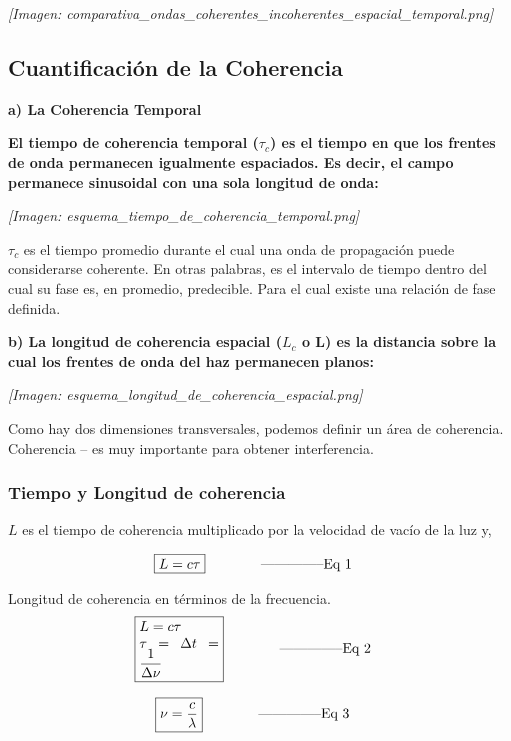 \documentclass[12pt]{article}
\begin{document}
	\textit{[Imagen: comparativa\_ondas\_coherentes\_incoherentes\_espacial\_temporal.png]}
	
	\subsection{Cuantificación de la Coherencia}
	\textbf{a) La Coherencia Temporal}
	
	\textbf{El tiempo de coherencia temporal ($\tau_c$) es el tiempo en que los frentes de onda permanecen igualmente espaciados. Es decir, el campo permanece sinusoidal con una sola longitud de onda:}
	
	\begin{center}
		\textit{[Imagen: esquema\_tiempo\_de\_coherencia\_temporal.png]}
	\end{center}
	
	$\tau_c$ es el tiempo promedio durante el cual una onda de propagación puede considerarse coherente. En otras palabras, es el intervalo de tiempo dentro del cual su fase es, en promedio, predecible. Para el cual existe una relación de fase definida.
	
	\textbf{b) La longitud de coherencia espacial ($L_c$ o L) es la distancia sobre la cual los frentes de onda del haz permanecen planos:}
	
	\textit{[Imagen: esquema\_longitud\_de\_coherencia\_espacial.png]}
	
	Como hay dos dimensiones transversales, podemos definir un área de coherencia. Coherencia – es muy importante para obtener interferencia.
	
	\subsubsection*{Tiempo y Longitud de coherencia}
	$L$ es el tiempo de coherencia multiplicado por la velocidad de vacío de la luz y,
	
	\begin{align*}
		\text{\fbox{$L = c \tau$}} \qquad \qquad &\text{--------------Eq 1}
	\end{align*}
	
	Longitud de coherencia en términos de la frecuencia.
	\begin{align*}
		\text{\fbox{\parbox{2cm}{$L = c \tau$ \\ $\tau = \Delta t = \frac{1}{\Delta \nu}$}}} \qquad \qquad &\text{--------------Eq 2}
	\end{align*}
	
	\begin{align*}
		\text{\fbox{$\nu = \frac{c}{\lambda}$}} \qquad \qquad &\text{--------------Eq 3}
	\end{align*}
	
\end{document}
